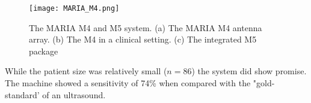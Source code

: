 \begin{figure}
    \texttt{[image: MARIA\_M4.png]}
    \centering
    \caption{The MARIA M4 and M5 system. (a) The MARIA M4 antenna array. (b) The M4 in a clinical setting. (c) The integrated M5 package}
    \label{fig:MARIAM4}
\end{figure}

\noindent While the patient size was relatively small ($n = 86$) the system did show promise. The machine showed a
sensitivity of 74\% when compared with the "gold-standard' of an ultrasound.  